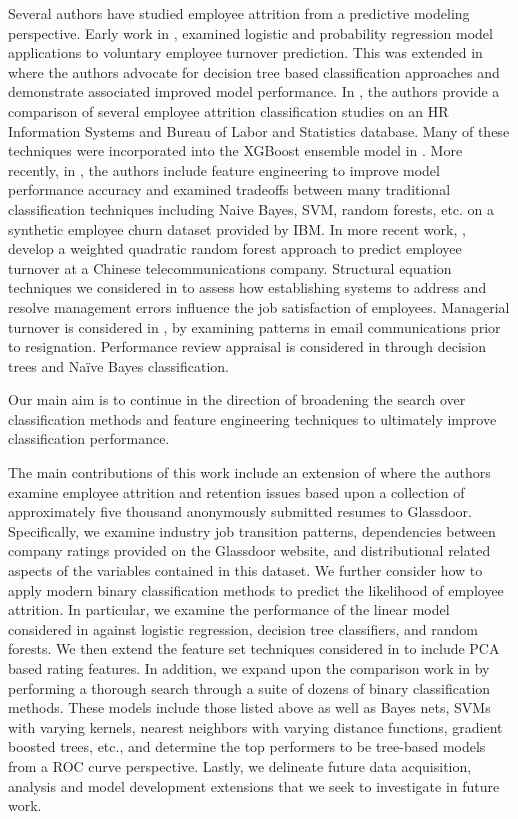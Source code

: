 \documentclass[10pt]{article}
\begin{document}
Several authors have studied employee attrition from a predictive modeling perspective.  Early work in 
\cite{Hong}, examined logistic and probability regression model applications to voluntary 
employee turnover prediction.  This was extended in 
\cite{Alao2013,Jantan} where the authors advocate for 
decision tree based classification approaches and demonstrate associated improved model performance.
In \cite{Saradhi2011}, the authors provide a comparison of several employee attrition 
classification studies on an HR Information Systems and 
Bureau of Labor and Statistics database.  Many of these techniques were 
incorporated into the XGBoost ensemble model in \cite{Punnoose}.
More recently, in \cite{Yigit2017}, the authors include feature engineering to improve model performance 
accuracy and examined tradeoffs between
many traditional classification techniques including Naive Bayes, SVM, random forests, etc. on 
a synthetic employee churn dataset provided by IBM.  In more recent work, \cite{Gao2019}, develop 
a weighted quadratic random forest approach to predict employee turnover at a Chinese telecommunications 
company.  Structural equation techniques we considered in \cite{Jung2019} to assess how 
establishing systems to address and resolve management errors influence the job satisfaction 
of employees. Managerial turnover is considered in \cite{Gloor2017}, by examining patterns 
in email communications prior to resignation.  Performance review appraisal is considered 
in \cite{Mahmoud2019} through decision trees and Na\"{i}ve Bayes classification.

Our main aim is to continue in the 
direction of broadening the search over classification methods and feature engineering techniques 
to ultimately improve classification performance.

The main contributions of this work include an extension of \cite{Smart2016} where the authors 
examine employee 
attrition and retention issues based upon 
a collection of approximately five thousand anonymously submitted resumes to Glassdoor.  
Specifically, we examine industry job transition patterns, dependencies between company ratings 
provided on the Glassdoor website, and distributional related aspects of the variables 
contained in this dataset.  We further consider how to apply modern binary classification 
methods to predict the likelihood of employee attrition.  In particular, we examine the 
performance of the linear model considered in \cite{Smart2016, Fri2018, Naga} against logistic regression, 
decision tree classifiers, and random forests.  We then extend the feature set techniques considered in
\cite{Yigit2017} to include PCA based rating features. In addition, we expand upon the 
comparison work in \cite{Saradhi2011,Punnoose} by performing a thorough search through 
a suite of dozens of binary classification methods.  These models include those listed above as 
well as Bayes nets, SVMs with varying kernels, nearest neighbors with varying distance 
functions, gradient boosted trees, etc., and  determine 
the top performers to be tree-based models from a ROC curve perspective.
 Lastly, we delineate 
future data acquisition, analysis and model development extensions that we seek to investigate 
in future work.  
\end{document}

